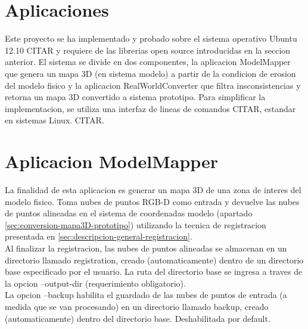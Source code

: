 \section{Aplicaciones}

Este proyecto se ha implementado y probado sobre el sistema operativo Ubuntu 12.10 CITAR y requiere de las librerias open source introducidas en la seccion anterior. El sistema se divide en dos componentes, la aplicacion ModelMapper que genera un mapa 3D (en sistema modelo) a partir de la condicion de erosion del modelo fisico y la aplicacion RealWorldConverter que filtra insconsistencias y retorna un mapa 3D convertido a sistema prototipo. Para simplificar la implementacion, se utiliza una interfaz de lineas de comandos CITAR, estandar en sistemas Linux. CITAR.


\section{Aplicacion ModelMapper}

La finalidad de esta aplicacion es generar un mapa 3D de una zona de interes del modelo fisico. Toma nubes de puntos RGB-D como entrada y devuelve las nubes de puntos alineadas en el sistema de coordenadas modelo (apartado \ref{sec:conversion-mapa3D-prototipo}) utilizando la tecnica de registracion presentada en \ref{sec:descripcion-general-registracion}. \\
Al finalizar la registracion, las nubes de puntos alineadas se almacenan en un directorio llamado registration, creado (automaticamente) dentro de un directorio base especificado por el usuario. La ruta del directorio base se ingresa a traves de la opcion --output-dir (requerimiento obligatorio). \\
La opcion --backup habilita el guardado de las nubes de puntos de entrada (a medida que se van procesando) en un directorio llamado backup, creado (automaticamente) dentro del directorio base. Deshabilitada por default.\\

